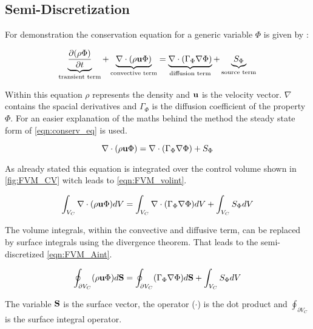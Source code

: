 \documentclass[../thesis.tex]{subfiles}
\begin{document}
\subsection{Semi-Discretization}

For demonstration the conservation equation for a generic variable $ \Phi $ is given by \cite{darwish2021finite}:

\begin{equation}
	\label{eqn:conserv_eq}
	\underbrace{\dfrac{\partial(\rho \Phi)}{\partial t}}_{\text{transient term}} + \underbrace{\nabla \cdot (\rho \bold{u} \Phi)}_{\text{convective term}} = \underbrace{\nabla \cdot (\Gamma_\Phi \nabla \Phi)}_{\text{diffusion term}} + \underbrace{S_\Phi}_{\text{source term}}
\end{equation}

Within this equation $ \rho $ represents the density and $ \bold{u} $ is the velocity vector. $ \nabla $ contains the spacial derivatives and $ \Gamma_\Phi $ is the diffusion coefficient of the property $ \Phi $.
For an easier explanation of the maths behind the method the steady state form of \autoref{eqn:conserv_eq} is used.

\begin{equation}
	\nabla \cdot (\rho \bold{u} \Phi) = \nabla \cdot (\Gamma_\Phi \nabla \Phi) + S_\Phi
\end{equation}

As already stated this equation is integrated over the control volume shown in \autoref{fig:FVM_CV} witch leads to \autoref{eqn:FVM_volint}.

\begin{equation}
	\label{eqn:FVM_volint}
	\int_{V_C} \nabla \cdot (\rho \bold{u} \Phi) dV = \int_{V_C} \nabla \cdot (\Gamma_\Phi \nabla \Phi) dV + \int_{V_C} S_\Phi dV
\end{equation}

The volume integrals, within the convective and diffusive term, can be replaced by surface integrals using the divergence theorem. That leads to the semi-discretized \autoref{eqn:FVM_Aint}.

\begin{equation}
	\label{eqn:FVM_Aint}
	\oint_{\partial V_C} (\rho \bold{u} \Phi) d\bold{S} = \oint_{\partial V_C} (\Gamma_\Phi \nabla \Phi) d\bold{S} + \int_{V_C} S_\Phi dV
\end{equation}

The variable $ \bold{S}$ is the surface vector, the operator ($\cdot$) is the dot product and $ \oint_{\partial V_C}$ is the surface integral operator.
\end{document}
